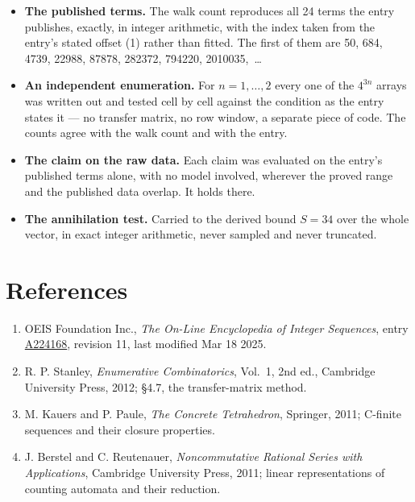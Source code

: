 \documentclass[11pt]{article}
\theoremstyle{definition}
\begin{document}
\begin{itemize}

\item {\bfseries The published terms.} The walk count reproduces all 24 terms the entry publishes, exactly, in integer arithmetic, with the index taken from the entry's stated offset (1) rather than fitted. The first of them are 50, 684, 4739, 22988, 87878, 282372, 794220, 2010035,~\dots

\item {\bfseries An independent enumeration.} For $n = 1,\dots,2$ every one of the $4^{3n}$ arrays was written out and tested cell by cell against the condition as the entry states it --- no transfer matrix, no row window, a separate piece of code. The counts agree with the walk count and with the entry.

\item {\bfseries The claim on the raw data.} Each claim was evaluated on the entry's published terms alone, with no model involved, wherever the proved range and the published data overlap. It holds there.

\item {\bfseries The annihilation test.} Carried to the derived bound $S = 34$ over the whole vector, in exact integer arithmetic, never sampled and never truncated.

\end{itemize}

\section{References}

\begin{enumerate}

\item OEIS Foundation Inc., \emph{The On-Line Encyclopedia of Integer Sequences}, entry \href{https://oeis.org/A224168}{A224168}, revision 11, last modified Mar 18 2025.

\item R. P. Stanley, \emph{Enumerative Combinatorics}, Vol.~1, 2nd ed., Cambridge University Press, 2012; \S4.7, the transfer-matrix method.

\item M. Kauers and P. Paule, \emph{The Concrete Tetrahedron}, Springer, 2011; C-finite sequences and their closure properties.

\item J. Berstel and C. Reutenauer, \emph{Noncommutative Rational Series with Applications}, Cambridge University Press, 2011; linear representations of counting automata and their reduction.

\end{enumerate}
\end{document}
